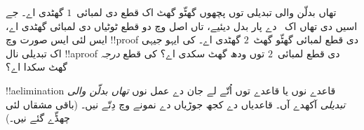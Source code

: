 \documentclass[../../../include/open-logic-section]{subfiles}
\begin{document}
\begin{prob}
تھاں بدلّن والی تبدیلی توں پچھوں گھٹّو گھٹ اک قطع دی لمبائی~$1$ گھٹدی اے۔ جے اسیں \Elim{\land} دی تھاں اک~\Elim{\lor} دے پار بدل دیئیے، تاں اصل وچ دو قطع ٹوٹیاں دی لمبائی گھٹدی اے، ایس لئی ایس صورت وچ !!{proof} دی قطع لمبائی گھٹّو گھٹ~$2$ گھٹدی اے۔ کی ایہو جیہی اک تبدیلی نال !!a{proof} دی قطع لمبائی~$2$ توں ودھ گھٹ سکدی اے؟ کی قطع \emph{درجہ} گھٹ سکدا اے؟
\end{prob}

!!a{elimination} قاعدے نوں \Elim{\lor} یا \Elim{\lexists} قاعدے توں اُتّے لے جان دے عمل نوں \emph{تھاں بدلّن والی تبدیلی} آکھدے آں۔ قاعدیاں دے کجھ جوڑیاں دے نمونے  وچ دِتّے نیں۔ (باقی مشقاں لئی چھڈّے گئے نیں۔)

\end{document}
